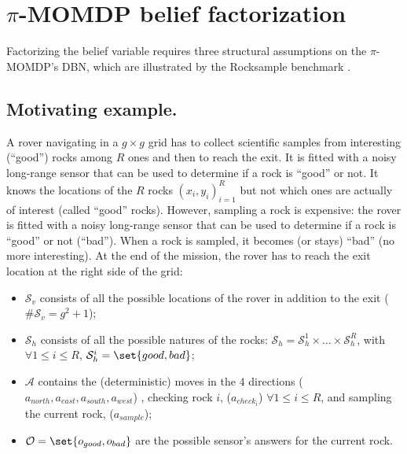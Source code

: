 \section{$\pi$-MOMDP belief factorization}
Factorizing the belief variable requires three structural assumptions on the 
$\pi$-MOMDP's DBN, which are illustrated by the Rocksample benchmark 
\cite{Smith:2004:HSV:1036843.1036906}.
\subsection{Motivating example.}
\label{section_RS_motivatingEx}
A rover navigating in a $g \times g$ grid has to collect scientific samples from 
interesting (``good'') rocks among $R$ ones and then to reach the exit. It is 
fitted with a noisy long-range sensor that can be used to determine if a rock 
is ``good'' or not.
It knows the locations of the $R$ rocks $(x_i,y_i)_{i=1}^R$ 
but not which ones are actually of interest (called ``good'' rocks). 
However, sampling a rock is expensive: 
the rover is fitted with a noisy long-range sensor that can be used to determine 
if a rock is ``good'' or not (``bad''). 
When a rock is sampled, 
it becomes (or stays) ``bad'' (no more interesting). 
At the end of the mission, the rover has to reach the exit location at the right side of the grid:
\begin{itemize}
\item $\mathcal{S}_{v}$ consists of all the possible locations of the rover %
in addition to the exit ($\# \mathcal{S}_v = g^2 +1$);
\item $\mathcal{S}_h$ consists of all the possible natures of the rocks:
$\mathcal{S}_h = \mathcal{S}^1_h \times \ldots \times \mathcal{S}^R_h$,
with $\forall 1 \leqslant i \leqslant R$, $\mathcal{S}^i_h=\set{ good,bad }$;
\item $\mathcal{A}$ contains the (deterministic) moves in the $4$ directions ($a_{north},a_{east},a_{south},a_{west}$)
, checking rock $i$, ($a_{check_i}$) 
$\forall 1 \leqslant i \leqslant R $, 
and sampling the current rock, ($a_{sample}$);
\item $\mathcal{O} = \set{ o_{good},o_{bad} }$ are the possible sensor's answers for the current rock. 
\end{itemize}

